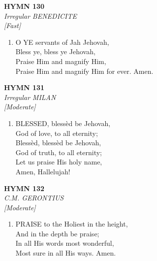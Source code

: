 \documentclass[11pt,a4paper]{article}
\begin{document}
\newpage
\begin{center}
    {\Large \textbf{HYMN 130}}
    \\
    \textit{Irregular BENEDICITE}
    \\
    \textit{\small [Fast]}
\end{center}
\vspace{1em}

\begin{enumerate}
    \item O YE servants of Jah Jehovah, \\
        Bless ye, bless ye Jehovah, \\
        Praise Him and magnify Him, \\
        Praise Him and magnify Him for ever. Amen.

\end{enumerate}

\newpage
\begin{center}
    {\Large \textbf{HYMN 131}}
    \\
    \textit{Irregular MILAN}
    \\
    \textit{\small [Moderate]}
\end{center}
\vspace{1em}

\begin{enumerate}
    \item BLESSED, bless\`ed be Jehovah, \\
        God of love, to all eternity; \\
        Bless\`ed, bless\`ed be Jehovah, \\
        God of truth, to all eternity; \\
        Let us praise His holy name, \\
        Amen, Hallelujah!

\end{enumerate}

\newpage
\begin{center}
    {\Large \textbf{HYMN 132}}
    \\
    \textit{C.M. GERONTIUS}
    \\
    \textit{\small [Moderate]}
\end{center}
\vspace{1em}

\begin{enumerate}
    \item PRAISE to the Holiest in the height, \\
        And in the depth be praise; \\
        In all His words most wonderful, \\
        Most sure in all His ways. Amen.

\end{enumerate}
\end{document}
